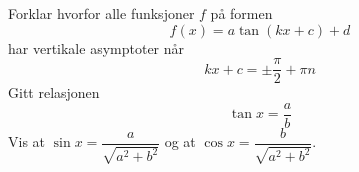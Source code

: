 Forklar hvorfor alle funksjoner $ f $ på formen
\[ f(x)= a \tan (kx+c)+d\]
har vertikale asymptoter når
\[ kx+c=\pm \frac{\pi}{2}+\pi n \]
\newpage
\ekspop
Gitt relasjonen
\[ \tan x = \frac{a}{b} \]
Vis at $ \sin x = \dfrac{a}{\sqrt{a^2+b^2}} $ og at $ \cos x = \dfrac{b}{\sqrt{a^2+b^2}} $.

